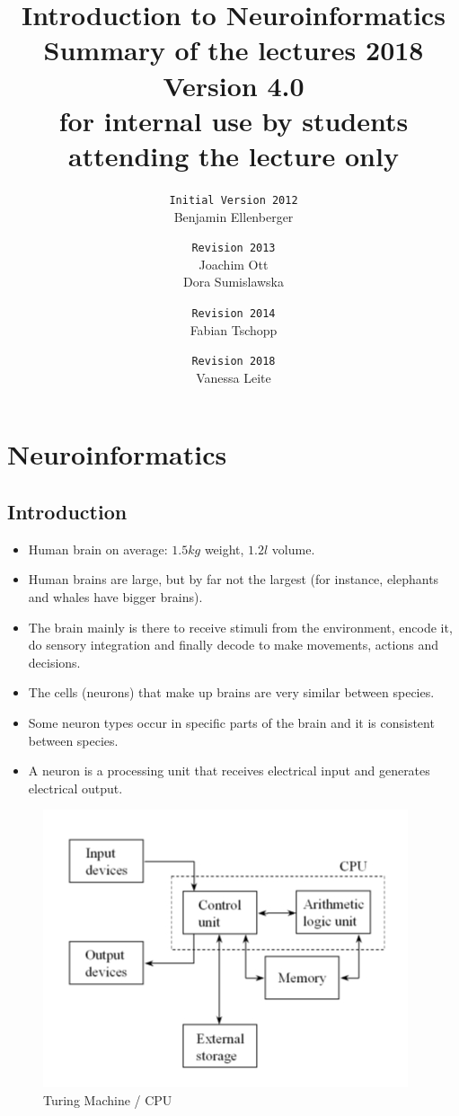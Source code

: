 \documentclass[a4paper, 12pt]{article}
\title{\textbf{Introduction to Neuroinformatics} \\Summary of the lectures
2018\\\normalsize Version 4.0 \\
for internal use by students attending the lecture only}
\author{
\texttt{Initial Version 2012}\\
	Benjamin Ellenberger
\and
\texttt{Revision 2013}\\
	Joachim Ott\\Dora Sumislawska
\and
\texttt{Revision 2014}\\
	Fabian Tschopp
\and
\texttt{Revision 2018}\\
	Vanessa Leite}
\date{}
\begin{document}
\maketitle
\newpage
\tableofcontents
\newpage

\section{Neuroinformatics}
\subsection{Introduction}
\begin{itemize}[noitemsep,nolistsep]
	\item Human brain on average: $1.5 kg$ weight, $1.2 l$ volume.
	\item Human brains are large, but by far not the largest (for instance, elephants and whales have bigger brains).
	\item The brain mainly is there to receive stimuli from the environment, encode it, do sensory integration and finally decode to make movements, actions and decisions.
	\item The cells (neurons) that make up brains are very similar between species.
	\item Some neuron types occur in specific parts of the brain and it is consistent between species.
	\item A neuron is a processing unit that receives electrical input and generates electrical output.

\end{itemize}
\begin{figure}[htbp]
	\centering
	\includegraphics[scale=0.6]{1_2.jpg}
 	\caption{Turing Machine / CPU}
\end{figure} 
\end{document}
